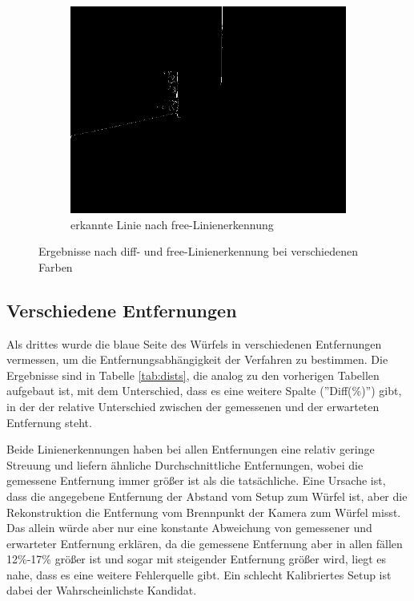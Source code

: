 \documentclass[ngerman,a4paper,parskip=half]{scrartcl}
\begin{document}
\begin{figure}[H]
\begin{subfigure}{0.32\textwidth}
		\includegraphics[width=\textwidth]{includes/orange_0_free.png}
		\caption{erkannte Linie nach free-Linienerkennung}
		\label{fig:orange_0_free}
	\end{subfigure}
	\caption{Ergebnisse nach diff- und free-Linienerkennung bei verschiedenen Farben}
	\label{fig:blue_0}
\end{figure}

\subsection{Verschiedene Entfernungen}
\label{sec:dists}

Als drittes wurde die blaue Seite des Würfels in verschiedenen Entfernungen vermessen, um die Entfernungsabhängigkeit der Verfahren zu bestimmen. Die Ergebnisse sind in Tabelle \ref{tab:dists}, die analog zu den vorherigen Tabellen aufgebaut ist, mit dem Unterschied, dass es eine weitere Spalte (''Diff(\%)'') gibt, in der der relative Unterschied zwischen der gemessenen und der erwarteten Entfernung steht.

Beide Linienerkennungen haben bei allen Entfernungen eine relativ geringe Streuung und liefern ähnliche Durchschnittliche Entfernungen, wobei die gemessene Entfernung immer größer ist als die tatsächliche. Eine Ursache ist, dass die angegebene Entfernung der Abstand vom Setup zum Würfel ist, aber die Rekonstruktion die Entfernung vom Brennpunkt der Kamera zum Würfel misst. Das allein würde aber nur eine konstante Abweichung von gemessener und erwarteter Entfernung erklären, da die gemessene Entfernung aber in allen fällen 12\%-17\% größer ist und sogar mit steigender Entfernung größer wird, liegt es nahe, dass es eine weitere Fehlerquelle gibt. Ein schlecht Kalibriertes Setup ist dabei der Wahrscheinlichste Kandidat.
\end{document}
